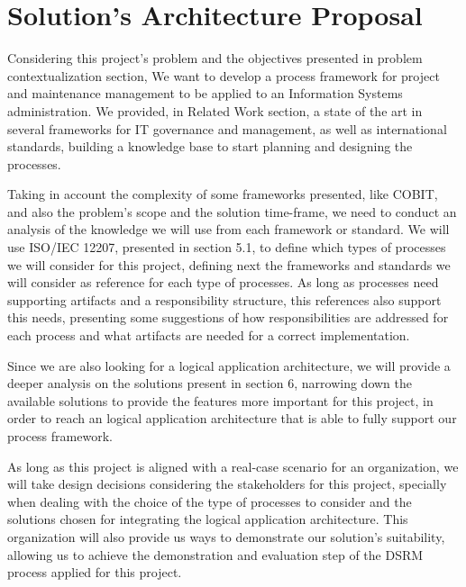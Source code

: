 
% 
% 

\section{Solution's Architecture Proposal}

Considering this project's problem and the objectives presented in problem contextualization section, We want to develop a process framework for project and maintenance management to be applied to an Information Systems administration. We provided, in Related Work section, a state of the art in several frameworks for IT governance and management, as well as international standards, building a knowledge base to start planning and designing the processes.\par
Taking in account the complexity of some frameworks presented, like COBIT, and also the problem's scope and the solution time-frame, we need to conduct an analysis of the knowledge we will use from each framework or standard. We will use ISO/IEC 12207, presented in section 5.1, to define which types of processes we will consider for this project, defining next the frameworks and standards we will consider as reference for each type of processes. As long as processes need supporting artifacts and a responsibility structure, this references also support this needs, presenting some suggestions of how responsibilities are addressed for each process and what artifacts are needed for a correct implementation.\par
Since we are also looking for a logical application architecture, we will provide a deeper analysis on the solutions present in section 6, narrowing down the available solutions to provide the features more important for this project, in order to reach an logical application architecture that is able to fully support our process framework.\par
As long as this project is aligned with a real-case scenario for an organization, we will take design decisions considering the stakeholders for this project, specially when dealing with the choice of the type of processes to consider and the solutions chosen for integrating the logical application architecture. This organization will also provide us ways to demonstrate our solution's suitability, allowing us to achieve the demonstration and evaluation step of the DSRM process applied for this project.\par



